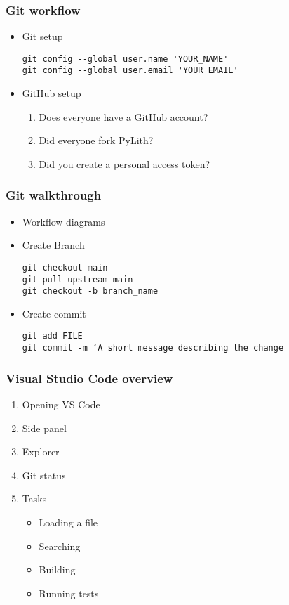 \documentclass[aspectratio=169]{beamer}
\begin{document}
\begin{frame}[fragile]
  \frametitle{Git workflow}
  \summary{}
  
  \begin{itemize}
  \item Git setup
    \begin{verbatim}
git config --global user.name 'YOUR_NAME'
git config --global user.email 'YOUR EMAIL'
\end{verbatim}
  \item GitHub setup
    \begin{enumerate}
    \item Does everyone have a GitHub account?
    \item Did everyone fork PyLith?
    \item Did you create a personal access token?
    \end{enumerate}
  \end{itemize}
  
\end{frame}


\begin{frame}[fragile]
  \frametitle{Git walkthrough}
  \summary{}
  

  \begin{itemize}
  \item Workflow diagrams
  \item Create Branch
    \begin{verbatim}
git checkout main
git pull upstream main
git checkout -b branch_name
    \end{verbatim}
  \item Create commit
  \begin{verbatim}
git add FILE
git commit -m ‘A short message describing the change
\end{verbatim}
\end{itemize}
\end{frame}

\begin{frame}
  \frametitle{Visual Studio Code overview}
  \summary{}
  
  \begin{enumerate}
  \item Opening VS Code
  \item Side panel
  \item Explorer
  \item Git status
  \item Tasks
    \begin{itemize}
    \item Loading a file
    \item Searching
    \item Building
    \item Running tests
    \end{itemize}
  \end{enumerate}
  
\end{frame}


\end{document}
